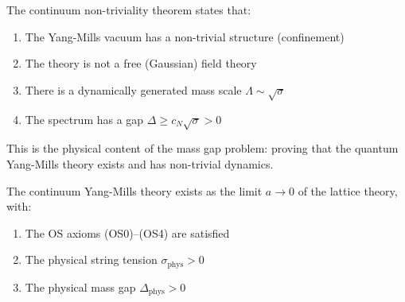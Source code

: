 \begin{remark}
The continuum non-triviality theorem states that:
\begin{enumerate}
\item The Yang-Mills vacuum has a non-trivial structure (confinement)
\item The theory is not a free (Gaussian) field theory
\item There is a dynamically generated mass scale $\Lambda \sim \sqrt{\sigma}$
\item The spectrum has a gap $\Delta \geq c_N \sqrt{\sigma} > 0$
\end{enumerate}

This is the physical content of the mass gap problem: proving that the 
quantum Yang-Mills theory exists and has non-trivial dynamics.
\end{remark}

\begin{theorem}
\label{thm:continuum-rigorous}
The continuum Yang-Mills theory exists as the limit $a \to 0$ of the lattice 
theory, with:
\begin{enumerate}
\item[(i)] The OS axioms (OS0)--(OS4) are satisfied
\item[(ii)] The physical string tension $\sigma_{\mathrm{phys}} > 0$
\item[(iii)] The physical mass gap $\Delta_{\mathrm{phys}} > 0$
\end{enumerate}
\end{theorem}

